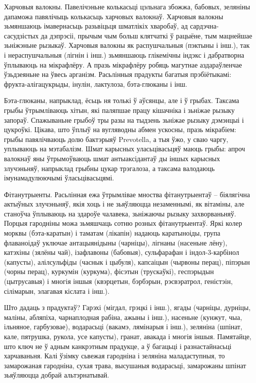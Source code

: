 Харчовыя валокны. Павелічэньне колькасьці цэльнага збожжа, бабовых, зеляніны дапаможа павялічыць колькасьць харчовых валокнаў. Харчовыя валокны зьмяншаюць імавернасьць разьвіцьця шматлікіх хваробаў, ад сардэчна-сасудзістых да дэпрэсіі, прычым чым больш клятчаткі ў рацыёне, тым мацнейшае зьніжэньне рызыкаў. Харчовыя валокны як распушчальныя (пэктыны і інш.), так і нераспушчальныя (лігнін і інш.) зьмяншаюць глікемічны індэкс і дабратворна ўплываюць на мікрафлёру. А празь мікрафлёру робяць магутнае аздараўленчае ўзьдзеяньне на ўвесь арганізм. Расьлінныя прадукты багатыя прэбіётыкамі: фрукта-алігацукрыды, інулін, лактулоза, бэта-глюканы і інш.

Бэта-глюканы, напрыклад, ёсьць ня толькі ў аўсянцы, але і ў грыбах. Таксама грыбы ўтрымліваюць хітын, які паляпшае працу кішачніка і зьніжае рызыку запораў. Спажываньне грыбоў тры разы на тыдзень зьніжае рызыку дэмэнцыі і цукроўкі. Цікава, што ўплыў на вугляводны абмен ускосны, празь мікрабіем: грыбы павялічваюць долю бактэрыяў Prevotella, а тыя ўжо, у сваю чаргу, уплываюць на мэтабалізм. Шмат карысных уласьцівасьцяў маюць грыбы: апроч валокнаў яны ўтрымоўваюць шмат антыаксідантаў ды іншых карысных злучэньняў, напрыклад грыбны цукар трэгалоза, а таксама валодаюць імунамадулюючымі ўласьцівасьцямі.

Фітанутрыенты. Расьлінная ежа ўтрымлівае мноства фітанутрыентаў – біялягічна актыўных злучэньняў, якія хоць і не зьяўляюцца незаменнымі, як вітаміны, але станоўча ўплываюць на здароўе чалавека, зьніжаючы рызыку захворваньняў. Порцыя гародніны можа зьмяшчаць сотню розных фітанутрыентаў. Яркі колер морквы (бэта-каратын) і таматам (лікапін) надаюць каратыноіды, група флаваноідаў уключае антацыянідыны (чарніцы), лігнаны (насеньне лёну), катэхіны (зялёны чай), ізафлавоны (бабовыя), сульфарафан і індол-3-карбінол (капусты), алілсульфіды (часнык і цыбуля), капсаіцын (чырвоны перац), піпэрын (чорны перац), куркумін (куркума), фісэтын (трускаўкі), геспэрыдын (цытрусавыя) і многія іншыя (квэрцетын, бэрбэрын, рэсвэратрол, геністэін, сілімарын, элагавая кіслата і інш.).

Што дадаць з прадуктаў? Гарэхі (мігдал, грэцкі і інш.), ягады (чарніцы, дурніцы, маліны, абляпіха, чарнаплодная рабіна, ажыны і інш.), насеньне (кунжут, чыа, ільняное, гарбузовае), водарасьці (вакамэ, лямінарыя і інш.), зеляніна (шпінат, кале, пятрушка, рукола, усе капусты), гранат, авакада і многія іншыя. Памятайце, што ключ не ў адным канкрэтным прадукце, а ў багацьці і разнастайнасьці харчаваньня. Калі ўзімку сьвежая гародніна і зеляніна маладаступныя, то замарожаная гародніна, сухая трава, высушаныя водарасьці, замарожаны шпінат зьяўляюцца добрай альтэрнатывай.

